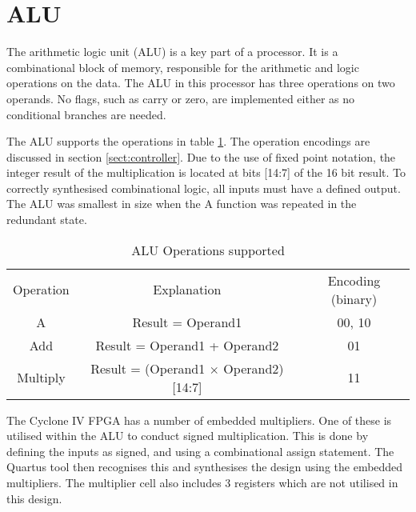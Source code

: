 

\section{ALU}

The arithmetic logic unit (ALU) is a key part of a processor. 
It is a combinational block of memory, responsible for the arithmetic and logic operations on the data.
The ALU in this processor has three operations on two operands.
No flags, such as carry or zero, are implemented either as no conditional branches are needed.

The ALU supports the operations in table \ref{tab:aluops}.
The operation encodings are discussed in section \ref{sect:controller}.
Due to the use of fixed point notation, the integer result of the multiplication is located at bits [14:7] of the 16 bit result.
To correctly synthesised combinational logic, all inputs must have a defined output.
The ALU was smallest in size when the A function was repeated in the redundant state.

\begin{table}
\caption{ALU Operations supported}
\label{tab:aluops}
\begin{tabular}{ccc}
Operation & Explanation & Encoding (binary)\\ 
A & Result = Operand1 & 00, 10 \\
Add & Result = Operand1 + Operand2 & 01 \\
Multiply & Result = (Operand1 $\times$ Operand2)[14:7] & 11 \\ 
\end{tabular}
\end{table}


The Cyclone IV FPGA has a number of embedded multipliers. 
One of these is utilised within the ALU to conduct signed multiplication. 
This is done by defining the inputs as signed, and using a combinational assign statement.
The Quartus tool then recognises this and synthesises the design using the embedded multipliers.
The multiplier cell also includes 3 registers which are not utilised in this design.



